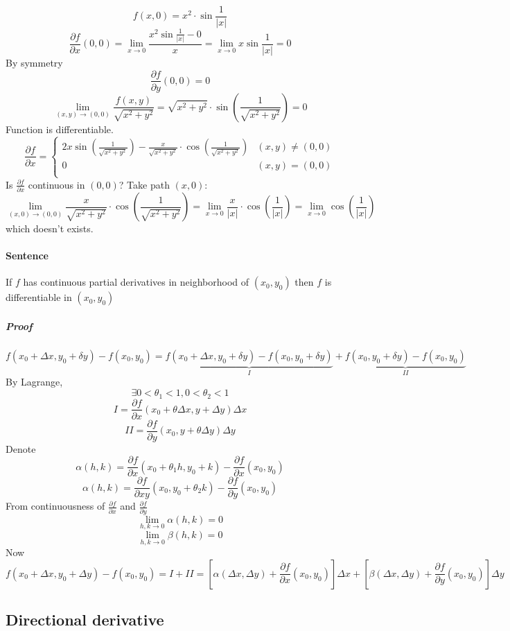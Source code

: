 $$f(x,0) =  x^2 \cdot \sin \frac{1}{|x|}$$
$$\frac{\partial f}{\partial x}(0,0) = \lim_{x\to 0} \frac{x^2\sin \frac{1}{|x|}-0}{x} = \lim_{x\to 0} x\sin \frac{1}{|x|} = 0$$
By symmetry
$$\frac{\partial f}{\partial y}(0,0) = 0$$
$$\lim_{(x,y) \to (0,0)} \frac{f(x,y)}{\sqrt{x^2+y^2}} = \sqrt{x^2+y^2} \cdot \sin \left(\frac{1}{\sqrt{x^2+y^2}}\right) = 0$$
Function is differentiable.
$$\frac{\partial f}{\partial x} = \begin{cases}
2x\sin \left(\frac{1}{\sqrt{x^2+y^2}}\right) - \frac{x}{\sqrt{x^2+y^2}}\cdot \cos \left(\frac{1}{\sqrt{x^2+y^2}}\right) &(x,y)\neq (0,0)\\
0&(x,y)= (0,0)\\
\end{cases}$$
Is $\frac{\partial f}{\partial x}$ continuous in $(0,0)$? Take path $(x,0)$:
$$\lim_{(x,0) \to (0,0)} \frac{x}{\sqrt{x^2+y^2}}\cdot \cos \left(\frac{1}{\sqrt{x^2+y^2}}\right) = \lim_{x\to 0}\frac{x}{|x|}\cdot \cos \left(\frac{1}{|x|}\right) =  \lim_{x\to 0} \cos \left(\frac{1}{|x|}\right)$$
which doesn't exists.
\paragraph{Sentence}
If $f$ has continuous partial derivatives in neighborhood of $(x_0,y_0)$ then $f$ is differentiable in $(x_0,y_0)$
\subparagraph{Proof}
$$f(x_0+\Delta x, y_0+\delta y) - f(x_0, y_0) = \underbrace{f(x_0+\Delta x, y_0+\delta y) - f(x_0, y_0+\delta y)}_{I} + \underbrace{f(x_0, y_0+\delta y) - f(x_0, y_0)}_{II}$$
By Lagrange, 
$$\exists 0<\theta_1 <1,0<\theta_2 <1$$
$$ I = \frac{\partial f}{\partial x}(x_0+\theta \Delta x, y + \Delta y)\Delta x$$
$$II = \frac{\partial f}{\partial y}(x_0, y +\theta  \Delta y)\Delta y$$
Denote 
$$\alpha(h,k) = \frac{\partial f}{\partial x}\left( x_0 + \theta_1 h, y_0 +k \right) - \frac{\partial f}{\partial x}\left( x_0, y_0 \right)$$
$$\alpha(h,k) = \frac{\partial f}{\partial xy}\left( x_0, y_0 +\theta_2 k \right) - \frac{\partial f}{\partial y}\left( x_0, y_0 \right)$$
From continuousness of $\frac{\partial f}{\partial x}$ and $\frac{\partial f}{\partial y}$
$$\lim_{h,k \to 0} \alpha(h,k) = 0$$
$$\lim_{h,k \to 0} \beta(h,k) = 0$$
Now
$$f(x_0+\Delta x, y_0 + \Delta y) - f(x_0,y_0) = I+II = \left[ \alpha(\Delta x, \Delta y) + \frac{\partial f}{\partial x}(x_0,y_0) \right]\Delta x+\left[ \beta(\Delta x, \Delta y) + \frac{\partial f}{\partial y}(x_0,y_0) \right]\Delta y$$
\subsection{Directional derivative}
